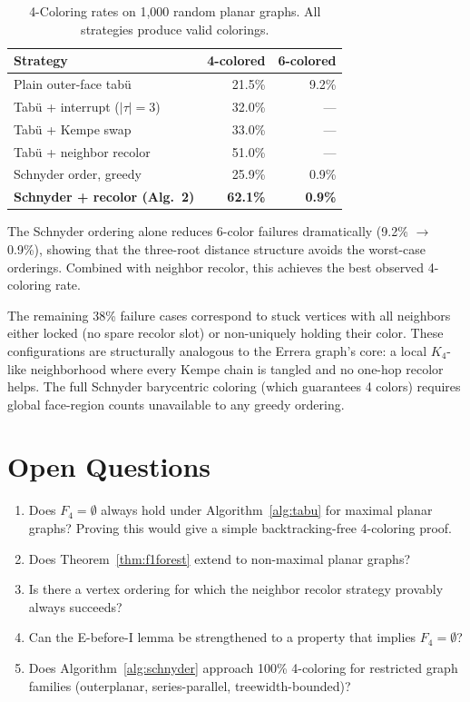 \documentclass[11pt,twocolumn]{article}
\begin{document}
\begin{table}[t]
\caption{4-Coloring rates on 1{,}000 random planar graphs.
All strategies produce valid colorings.}
\label{tab:results}
\centering\small
\begin{tabular}{lrr}
\toprule
\textbf{Strategy} & \textbf{4-colored} & \textbf{6-colored} \\
\midrule
Plain outer-face tab\"{u}             & 21.5\% & 9.2\% \\
Tab\"{u} + interrupt ($|\tau|=3$)     & 32.0\% & ---   \\
Tab\"{u} + Kempe swap                 & 33.0\% & ---   \\
Tab\"{u} + neighbor recolor           & 51.0\% & ---   \\
Schnyder order, greedy                & 25.9\% & 0.9\% \\
\textbf{Schnyder + recolor (Alg.~2)}  & \textbf{62.1\%} & \textbf{0.9\%} \\
\bottomrule
\end{tabular}
\end{table}

The Schnyder ordering alone reduces 6-color failures dramatically (9.2\%
$\to$ 0.9\%), showing that the three-root distance structure avoids the
worst-case orderings. Combined with neighbor recolor, this achieves the best
observed 4-coloring rate.

The remaining 38\% failure cases correspond to stuck vertices with all
neighbors either locked (no spare recolor slot) or non-uniquely holding their
color. These configurations are structurally analogous to the Errera graph's
core: a local $K_4$-like neighborhood where every Kempe chain is tangled and
no one-hop recolor helps. The full Schnyder barycentric coloring (which
guarantees 4 colors) requires global face-region counts unavailable to any
greedy ordering.

\section{Open Questions}
\label{sec:open}

\begin{enumerate}[label=\textbf{Q\arabic*.},noitemsep]
  \item Does $F_4=\emptyset$ always hold under Algorithm~\ref{alg:tabu} for
        maximal planar graphs? Proving this would give a simple backtracking-free
        4-coloring proof.
  \item Does Theorem~\ref{thm:f1forest} extend to non-maximal planar graphs?
  \item Is there a vertex ordering for which the neighbor recolor strategy
        provably always succeeds?
  \item Can the E-before-I lemma be strengthened to a property that implies
        $F_4=\emptyset$?
  \item Does Algorithm~\ref{alg:schnyder} approach 100\% 4-coloring for
        restricted graph families (outerplanar, series-parallel,
        treewidth-bounded)?
\end{enumerate}
\end{document}
